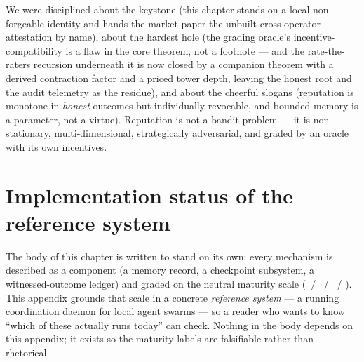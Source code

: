 \documentclass[11pt,a4paper]{article}
\theoremstyle{definition}
\begin{document}
We were disciplined about the keystone (this chapter stands on a local non-forgeable
identity and hands the market paper the unbuilt cross-operator attestation by
name), about the hardest hole (the grading oracle's incentive-compatibility is a
flaw in the core theorem, not a footnote --- and the rate-the-raters recursion
underneath it is now closed by a companion theorem with a derived contraction
factor and a priced tower depth, leaving the honest root and the audit telemetry as
the residue),
and about the cheerful slogans (reputation is monotone in \emph{honest} outcomes
but individually revocable, and bounded memory is a parameter, not a virtue).
Reputation is not a bandit problem --- it is non-stationary, multi-dimensional,
strategically adversarial, and graded by an oracle with its own incentives.


\appendix
\section{Implementation status of the reference system}\label{app:status}

The body of this chapter is written to stand on its own: every mechanism is described
as a component (a memory record, a checkpoint subsystem, a witnessed-outcome ledger) and
graded on the neutral maturity scale (\BUILT~/ \BUILTWEAK~/ \DESIGNED~/ \VISION).
This appendix grounds that scale in a concrete \emph{reference system} --- a running
coordination daemon for local agent swarms --- so a reader who wants to know
``which of these actually runs today'' can check. Nothing in the body depends on
this appendix; it exists so the maturity labels are falsifiable rather than
rhetorical.
\end{document}
